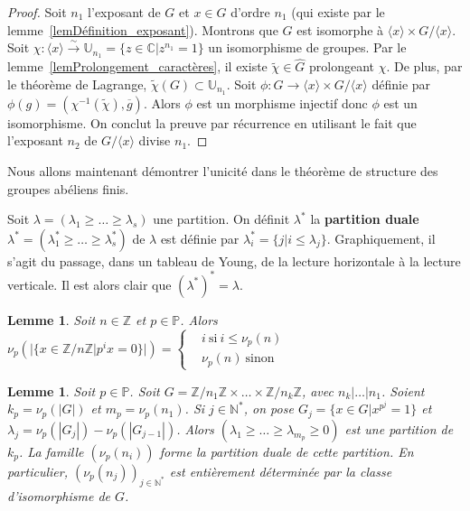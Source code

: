 \documentclass[a4paper]{article}
\theoremstyle{definition} %
\theoremstyle{plain} %
\newtheorem{Lem}[Def]{Lemme} %
\theoremstyle{remark} %
\newcommand{\C}{\mathbb{C}}
\newcommand{\N}{\mathbb{N}}
\newcommand{\Z}{\mathbb{Z}}
\newcommand{\p}{\mathbb{P}}
\newcommand{\wg}{\widehat{G}}
\begin{document}
\begin{proof}
Soit $n_1$ l'exposant de $G$ et $x\in G$ d'ordre $n_1$ (qui existe par le lemme~\ref{lemDéfinition_exposant}). Montrons que $G$ est isomorphe à $\langle x\rangle \times G/\langle x \rangle$. Soit $\chi:\langle x\rangle\overset{\sim}{\rightarrow} \mathbb{U}_{n_1}=\{z\in \C|z^{n_1}=1\}$ un isomorphisme de groupes. Par le lemme~\ref{lemProlongement_caractères}, il existe $\widetilde{\chi}\in \wg$ prolongeant $\chi$. De plus, par le théorème de Lagrange, $\widetilde{\chi}(G)\subset \mathbb{U}_{n_1}$. Soit $\phi:G\rightarrow \langle x\rangle \times G/\langle x\rangle$ définie par $\phi(g)=(\chi^{-1}(\widetilde{\chi}),\overline{g})$. Alors $\phi$ est un morphisme injectif donc $\phi$ est un isomorphisme. On conclut la preuve par récurrence en utilisant le fait que l'exposant $n_2$ de $G/\langle x \rangle$ divise $n_1$.
 
\end{proof}

Nous allons maintenant démontrer l'unicité dans le théorème de structure des groupes abéliens finis. 

Soit $\lambda=(\lambda_1\geq \ldots \geq \lambda_s)$ une partition. On définit $\lambda^*$ la \textbf{partition duale} $\lambda^*=(\lambda_1^*\geq \ldots \geq \lambda_s^*)$ de $\lambda$ est définie par $\lambda_i^*=\{j|i\leq \lambda_j\}$. Graphiquement, il s'agit du passage, dans un tableau de Young, de la lecture horizontale à la lecture verticale. Il est alors clair que $(\lambda^*)^*=\lambda$. 

\begin{Lem}\label{lemCalcul_cardinal_G_j}
Soit $n\in  \Z$ et $p\in \p$. Alors $\nu_p(|\{x\in \Z/n\Z|p^ix=0\}|)=\left\{\begin{aligned} & i \ \mathrm{si\ }i\leq \nu_p(n) \\ & \nu_p(n)\mathrm{\ sinon}\end{aligned}\right.$
\end{Lem}


\begin{Lem}\label{lemUnicité_classification}
Soit $p\in \p$. Soit $G=\Z/n_1\Z\times\ldots \times \Z/n_k\Z$, avec $n_k|\ldots |n_1$. Soient $k_p=\nu_p(|G|)$ et $m_p=\nu_p(n_1)$. Si $j\in \N^*$, on pose $G_j=\{x\in G|x^{p^j}=1\}$ et $\lambda_j=\nu_p(|G_j|)-\nu_p(|G_{j-1}|)$. Alors $(\lambda_1\geq \ldots \geq \lambda_{m_p}\geq 0)$ est une partition de $k_p$. La famille $(\nu_p(n_i))$ forme la partition duale de cette partition. En particulier, $(\nu_p(n_j))_{j\in \N^*}$ est entièrement déterminée par la classe d'isomorphisme de $G$.
\end{Lem}
\end{document}
